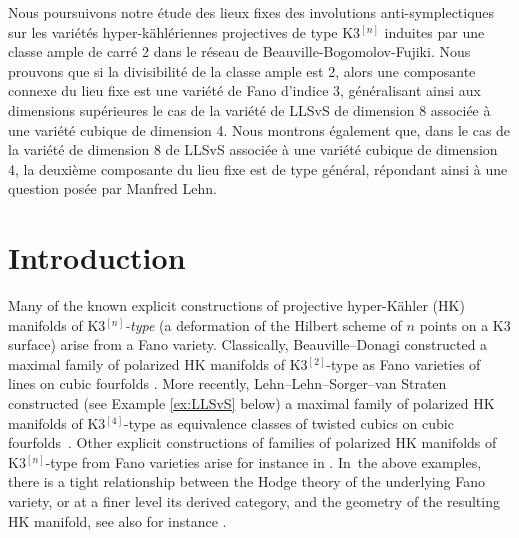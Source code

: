 \documentclass[JEP,XML,SOM,Unicode,published]{cedram}
\newcommand{\HK}{\textup{HK}\xspace}
\theoremstyle{definition}
\begin{document}




\begin{altabstract}
Nous poursuivons notre étude des lieux fixes des involutions anti-symplectiques sur les variétés hyper-kählériennes projectives de type K3$^{[n]}$ induites par une classe ample de carré 2 dans le réseau de Beauville-Bogomolov-Fujiki. Nous prouvons que si la divisibilité de la classe ample est 2, alors une composante connexe du lieu fixe est une variété de Fano d'indice 3, généralisant ainsi aux dimensions supérieures le cas de la variété de LLSvS de dimension 8 associée à une variété cubique de dimension 4. Nous montrons également que, dans le cas de la variété de dimension 8 de LLSvS associée à une variété cubique de dimension 4, la deuxième composante du lieu fixe est de type général, répondant ainsi à une question posée par Manfred Lehn.
\end{altabstract}

\maketitle

\tableofcontents
\mainmatter

\section{Introduction}\label{sec:intro}

Many of the known explicit constructions of projective hyper-Kähler (\HK) manifolds of K3$^{[n]}$\emph{-type} (\ie a deformation of the Hilbert scheme of $n$ points on a K3 surface) arise from a Fano variety.
Classically, Beauville--Donagi constructed a maximal family of polarized \HK manifolds of K3$^{[2]}$-type as Fano varieties of lines on cubic fourfolds \cite{BD:Fano}.
More recently, Lehn--Lehn--Sorger--van Straten constructed (see Example \ref{ex:LLSvS} below) a maximal family of polarized \HK manifolds of K3$^{[4]}$-type as equivalence classes of twisted cubics on cubic fourfolds~\cite{LLSvS:cubics}.
Other explicit constructions of families of polarized \HK manifolds of K3$^{[n]}$-type from Fano varieties arise for instance in \cite{DV:varieties,IM:Fano, DK:GMvarieties,IM:magicsquare,FM:Fano}. In~the above examples, there is a tight relationship between the Hodge theory of the underlying Fano variety, or at a finer level its derived category, and the geometry of the resulting \HK manifold, see also for instance \cite{BLMNPS:family,PPZ:GM,LPZ:twisted}.
\end{document}
